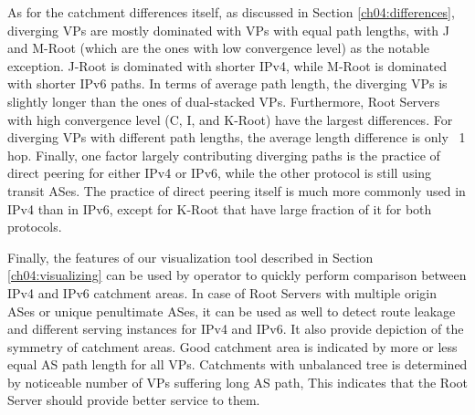As for the catchment differences itself, as discussed in Section \ref{ch04:differences}, diverging VPs are mostly dominated with VPs with equal path lengths, with J and M-Root (which are the ones with low convergence level) as the notable exception. J-Root is dominated with shorter IPv4, while M-Root is dominated with shorter IPv6 paths. In terms of average path length, the diverging VPs is slightly longer than the ones of dual-stacked VPs. Furthermore, Root Servers with high convergence level (C, I, and K-Root) have the largest differences. For diverging VPs with different path lengths, the average length difference is only ~1 hop. Finally, one factor largely contributing diverging paths is the practice of direct peering for either IPv4 or IPv6, while the other protocol is still using transit ASes. The practice of direct peering itself is much more commonly used in IPv4 than in IPv6, except for K-Root that have large fraction of it for both protocols.

Finally, the features of our visualization tool described in Section \ref{ch04:visualizing} can be used by operator to quickly perform comparison between IPv4 and IPv6 catchment areas. In case of Root Servers with multiple origin ASes or unique penultimate ASes, it can be used as well to detect route leakage and different serving  instances for IPv4 and IPv6. It also provide depiction of the symmetry of catchment areas. Good catchment area is indicated by more or less equal AS path length for all VPs. Catchments with unbalanced tree is determined by noticeable number of VPs suffering long AS path, This indicates that the Root Server should provide better service to them.




